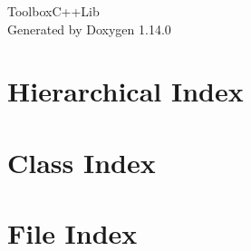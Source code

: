 \documentclass[twoside]{book}
\newcommand{\+}{\discretionary{\mbox{\scriptsize$\hookleftarrow$}}{}{}}
\newcommand{\clearemptydoublepage}{%
    \newpage{\pagestyle{empty}\cleardoublepage}%
  }
\begin{document}
  \raggedbottom
    \hypersetup{pageanchor=false,
                bookmarksnumbered=true,
                pdfencoding=unicode
               }
  \begin{titlepage}
  \vspace*{7cm}
  \begin{center}%
  {\Large Toolbox\+C++\+Lib}\\
  \vspace*{1cm}
  {\large Generated by Doxygen 1.14.0}\\
  \end{center}
  \end{titlepage}
  \clearemptydoublepage
  \tableofcontents
  \clearemptydoublepage
  \hypersetup{pageanchor=true}
\chapter{Hierarchical Index}

\chapter{Class Index}

\chapter{File Index}

\end{document}

